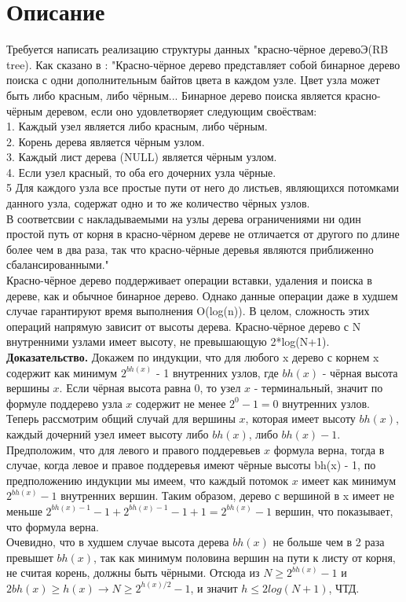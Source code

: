 \section{Описание}
Требуется написать реализацию структуры данных "красно-чёрное деревоЭ(RB tree).
Как сказано в \cite{Kormen}: "Красно-чёрное дерево представляет собой бинарное дерево поиска с одни дополнительным байтов цвета в каждом узле.
Цвет узла может быть либо красным, либо чёрным... Бинарное дерево поиска является красно-чёрным деревом, если оно удовлетворяет следующим своёствам:
\\1. Каждый узел является либо красным, либо чёрным.
\\2. Корень дерева является чёрным узлом.
\\3. Каждый лист дерева (NULL) является чёрным узлом.
\\4. Если узел красный, то оба его дочерних узла чёрные.
\\5 Для каждого узла все простые пути от него до листьев, являющихся потомками данного узла, содержат одно и то же количество чёрных узлов.
\\В соответсвии с накладываемыми на узлы дерева ограничениями ни один простой путь от корня в красно-чёрном дереве не отличается от другого по длине более чем в два раза, так что красно-чёрные деревья являются приближенно сбалансированными."
\\Красно-чёрное дерево поддерживает операции вставки, удаления и поиска в дереве, как и обычное бинарное дерево. Однако данные операции даже в худшем случае гарантируют время выполнения O(log(n)).
В целом, сложность этих операций напрямую зависит от высоты дерева. Красно-чёрное дерево с N внутренними узлами имеет высоту, не превышающую 2*log(N+1).
\\{\bfseries Доказательство.} Докажем по индукции, что для любого x дерево с корнем 
x содержит как минимум $2^{bh(x)}$ - 1 внутренних узлов, где ${bh(x)}$ - чёрная
высота вершины $x$. Если чёрная высота равна 0, то узел $x$ - терминальный, значит по формуле поддерево узла $x$
содержит не менее $2^0 - 1 = 0$ внутренних узлов. Теперь рассмотрим общий случай для вершины $x$, которая имеет высоту $bh(x)$, каждый дочерний узел
имеет высоту либо $bh(x)$, либо $bh(x) - 1$. Предположим, что для левого и правого поддеревьев $x$ формула верна, тогда в случае, когда левое и правое поддеревья имеют чёрные высоты bh(x) - 1,
по предположению индукции мы имеем, что каждый потомок $x$ имеет как минимум $2^{bh(x)}-1$ внутренних вершин. Таким образом, дерево с вершиной в x имеет не меньше $2^{bh(x)-1}-1+2^{bh(x)-1}-1+1 = 2^{bh(x)}-1$ вершин, что показывает, что формула верна.
\\Очевидно, что в худшем случае высота дерева $bh(x)$ не больше чем в 2 раза превышет $bh(x)$, так как минимум половина вершин на пути к листу от корня, не считая корень, должны быть чёрными. Отсюда из $N \geq 2^{bh(x)} - 1$ и $2bh(x) \geq h(x) \rightarrow N \geq 2^{h(x)/2} - 1$, и значит
$h \leq 2log(N+1)$, ЧТД.
\pagebreak

